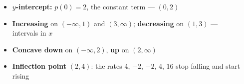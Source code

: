 \documentclass[aspectratio=169, 11pt]{beamer}
\newcommand{\pcurve}{plot[domain=-0.42:4.55, samples=80, smooth]
  (\x, {\x*\x*\x - 6*\x*\x + 9*\x + 2})}
\newcommand{\paxes}{%
  \draw[linegray, very thin, xstep=1, ystep=2] (-1,-4) grid (5,14);
  \draw[->, thick] (-1,0) -- (5.5,0) node[below right] {\small $x$};
  \draw[->, thick] (0,-4) -- (0,14.8) node[above] {\small $p(x)$};
  \foreach \x in {-1,1,2,3,4,5} \node[below, font=\scriptsize] at (\x,0) {\x};
  \foreach \y in {4,8,12} \node[left, font=\scriptsize] at (0,\y) {\y};}
\begin{document}
\begin{frame}[t, plain]

  \begin{columns}[T]
      \begin{center}
      \end{center}

      \begin{itemize}\setlength{\itemsep}{5pt}
        \item \textbf{$y$-intercept:} $p(0) = 2$, the constant term --- $(0, 2)$
        \item \textbf{Increasing} on $(-\infty, 1)$ and $(3, \infty)$; \textbf{decreasing} on
              $(1, 3)$ --- intervals in $x$
        \item \textbf{Concave down} on $(-\infty, 2)$, \textbf{up} on $(2, \infty)$
        \item \textbf{Inflection point} $(2, 4)$: the rates 4, $-2$, $-2$, 4, 16 stop falling
              and start rising
      \end{itemize}
  \end{columns}
\end{frame}
\end{document}
